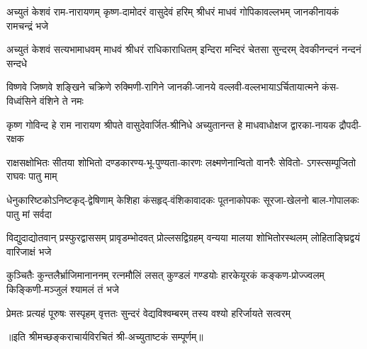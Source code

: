 

\fourlineindentedshloka
{अच्युतं केशवं राम-नारायणम्}
{कृष्ण-दामोदरं वासुदेवं हरिम्}
{श्रीधरं माधवं गोपिकावल्लभम्}
{जानकीनायकं रामचन्द्रं भजे}

\fourlineindentedshloka
{अच्युतं केशवं सत्यभामाधवम्}
{माधवं श्रीधरं राधिकाराधितम्}
{इन्दिरा मन्दिरं चेतसा सुन्दरम्}
{देवकीनन्दनं नन्दनं सन्दधे}

\fourlineindentedshloka
{विष्णवे जिष्णवे शङ्खिने चक्रिणे}
{रुक्मिणी-रागिने जानकी-जानये}
{वल्लवी-वल्लभायाऽर्चितायात्मने}
{कंस-विध्वंसिने वंशिने ते नमः}

\fourlineindentedshloka
{कृष्ण गोविन्द हे राम नारायण}
{श्रीपते वासुदेवार्जित-श्रीनिधे}
{अच्युतानन्त हे माधवाधोक्षज}
{द्वारका-नायक द्रौपदी-रक्षक}

\fourlineindentedshloka
{राक्षसक्षोभितः सीतया शोभितो}
{दण्डकारण्य-भू-पुण्यता-कारणः}
{लक्ष्मणेनान्वितो वानरैः सेवितो-}
{ऽगस्त्सम्पूजितो राघवः पातु माम्}

\fourlineindentedshloka
{धेनुकारिष्टकोऽनिष्टकृद्-द्वेषिणाम्}
{केशिहा कंसहृद्-वंशिकावादकः}
{पूतनाकोपकः सूरजा-खेलनो}
{बाल-गोपालकः पातु मां सर्वदा}

\fourlineindentedshloka
{विद्युदाद्योतवान् प्रस्फुरद्वाससम्}
{प्रावृडम्भोदवत् प्रोल्लसद्विग्रहम्}
{वन्यया मालया शोभितोरस्थलम्}
{लोहिताङ्घ्रिद्वयं वारिजाक्षं भजे}

\fourlineindentedshloka
{कुञ्चितैः कुन्तलैर्भ्राजिमानाननम्}
{रत्नमौलिं लसत् कुण्डलं गण्डयोः}
{हारकेयूरकं कङ्कण-प्रोज्ज्वलम्}
{किङ्किणी-मञ्जुलं श्यामलं तं भजे}

{प्रेमतः प्रत्यहं पूरुषः सस्पृहम्}
{वृत्ततः सुन्दरं वेद्यविश्वम्बरम्}
{तस्य वश्यो हरिर्जायते सत्वरम्}

॥इति श्रीमच्छङ्कराचार्यविरचितं श्री-अच्युताष्टकं सम्पूर्णम्॥